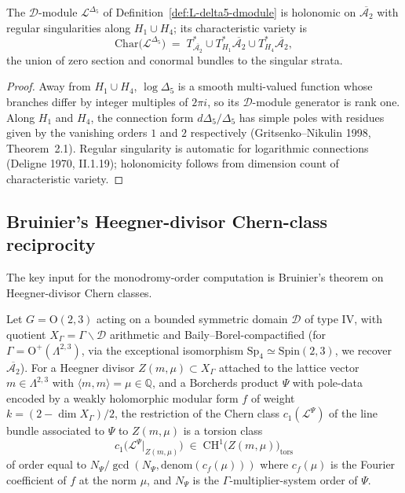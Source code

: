 \begin{lemma}
\label{lem:reg-sing-L-delta5}
The $\mathcal{D}$-module $\mathcal{L}^{\Delta_5}$ of Definition~\ref{def:L-delta5-dmodule} is holonomic on $\overline{\mathcal{A}_2}$ with regular singularities along $H_1\cup H_4$; its characteristic variety is
\[
 \mathrm{Char}\bigl(\mathcal{L}^{\Delta_5}\bigr)
 \;=\;
 T^*_{\overline{\mathcal{A}_2}}\cup T^*_{H_1}\overline{\mathcal{A}_2}\cup T^*_{H_4}\overline{\mathcal{A}_2},
\]
the union of zero section and conormal bundles to the singular strata.
\end{lemma}

\begin{proof}
Away from $H_1\cup H_4$, $\log\Delta_5$ is a smooth multi-valued function whose branches differ by integer multiples of $2\pi i$, so its $\mathcal{D}$-module generator is rank one. Along $H_1$ and $H_4$, the connection form $d\Delta_5/\Delta_5$ has simple poles with residues given by the vanishing orders $1$ and $2$ respectively (Gritsenko--Nikulin 1998, Theorem~2.1). Regular singularity is automatic for logarithmic connections (Deligne 1970, II.1.19); holonomicity follows from dimension count of characteristic variety.
\end{proof}

\subsection{Bruinier's Heegner-divisor Chern-class reciprocity}

The key input for the monodromy-order computation is Bruinier's theorem on Heegner-divisor Chern classes.

\begin{theorem}
\label{thm:bruinier-prop-5-1}
Let $G=\mathrm{O}(2,3)$ acting on a bounded symmetric domain $\mathcal{D}$ of type IV, with quotient $X_\Gamma=\Gamma\backslash\mathcal{D}$ arithmetic and Baily--Borel-compactified (for $\Gamma=\mathrm{O}^+(\Lambda^{2,3})$, via the exceptional isomorphism $\mathrm{Sp}_4\simeq \mathrm{Spin}(2,3)$, we recover $\overline{\mathcal{A}_2}$). For a Heegner divisor $Z(m,\mu)\subset X_\Gamma$ attached to the lattice vector $m\in\Lambda^{2,3}$ with $\langle m,m\rangle = \mu\in\mathbb{Q}$, and a Borcherds product $\Psi$ with pole-data encoded by a weakly holomorphic modular form $f$ of weight $k=(2-\dim X_\Gamma)/2$, the restriction of the Chern class $c_1(\mathcal{L}^\Psi)$ of the line bundle associated to $\Psi$ to $Z(m,\mu)$ is a torsion class
\[
 c_1\bigl(\mathcal{L}^\Psi\big|_{Z(m,\mu)}\bigr)
 \;\in\;
 \mathrm{CH}^1\bigl(Z(m,\mu)\bigr)_{\mathrm{tors}}
\]
of order equal to $N_\Psi/\gcd(N_\Psi,\mathrm{denom}(c_f(\mu)))$ where $c_f(\mu)$ is the Fourier coefficient of $f$ at the norm $\mu$, and $N_\Psi$ is the $\Gamma$-multiplier-system order of $\Psi$.
\end{theorem}

